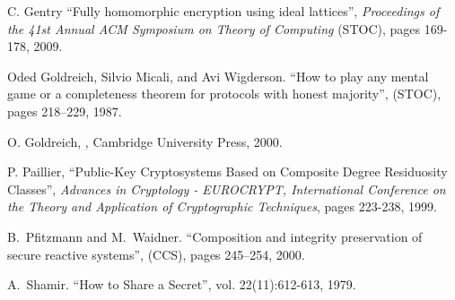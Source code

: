 \documentclass[letterpaper,11pt]{article}
\begin{document}
{\begin{thebibliography}{99}
C. Gentry ``Fully homomorphic encryption using ideal lattices'', {\it Proceedings of the 41st Annual ACM Symposium on Theory of Computing} (STOC), pages 169-178, 2009.

Oded Goldreich, Silvio Micali, and Avi Wigderson.
\newblock ``How to play any mental game or a completeness theorem for protocols
  with honest majority'',
 (STOC), pages 218--229, 1987.

 O. Goldreich,
, Cambridge University Press, 2000.

 P. Paillier, ``Public-Key Cryptosystems Based on Composite Degree Residuosity Classes'', \textit{Advances in Cryptology - EUROCRYPT, International Conference on the Theory and Application of Cryptographic Techniques}, pages 223-238, 1999.


B.\ Pfitzmann and M.\ Waidner.
\newblock ``Composition and integrity preservation of secure reactive systems'',
 (CCS), pages 245--254, 2000.


 A.\ Shamir. 
\newblock ``How to Share a Secret'',
 vol. 22(11):612-613, 1979.



\end{thebibliography}

} 
\appendix
\end{document}
